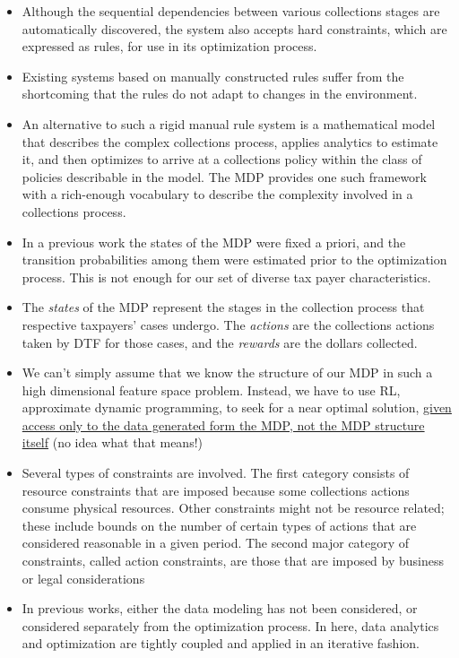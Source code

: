 \documentclass{article}
\theoremstyle{remark}
\theoremstyle{remark}
\theoremstyle{remark}
\theoremstyle{remark}
\theoremstyle{remark}
\theoremstyle{remark}
\begin{document}
\begin{itemize}
	\item Although the sequential dependencies between various collections stages are automatically discovered, the system also accepts hard constraints, which are expressed as rules, for use in its optimization process.
	\item Existing systems based on manually constructed rules suffer from the shortcoming that the rules do not adapt to changes in the environment.
	\item An alternative to such a rigid manual rule system is a mathematical model that describes the complex collections process, applies analytics to estimate it, and then optimizes to arrive at a collections policy within the class of policies describable in the model. The MDP provides one such framework with a rich-enough vocabulary to describe the complexity involved in a collections process.
	\item In a previous work the states of the MDP were fixed a priori, and the transition probabilities among them were estimated prior to the optimization process. This is not enough for our set of diverse tax payer characteristics.
	\item The \emph{states} of the MDP represent the stages in the collection process that respective taxpayers’ cases undergo. The \emph{actions} are the collections actions taken by DTF for those cases, and the \emph{rewards} are the dollars collected.
	\item We can't simply assume that we know the structure of our MDP in such a high dimensional feature space problem. Instead, we have to use RL, approximate dynamic programming, to seek for a near optimal solution, \underline{given access only to the data generated form the MDP, not the MDP structure itself} (no idea what that means!)
	\item Several types of constraints are involved. The first category consists of resource constraints that are imposed because some collections actions consume physical resources. Other constraints might not be resource related; these include bounds on the number of certain types of actions that are considered reasonable in a given period. The second major category of constraints, called action constraints, are those that are imposed by business or legal considerations
	\item In previous works, either the data modeling has not been considered, or considered separately from the optimization process. In here, data analytics and optimization are tightly coupled and applied in an iterative fashion.

\end{itemize}
\end{document}
